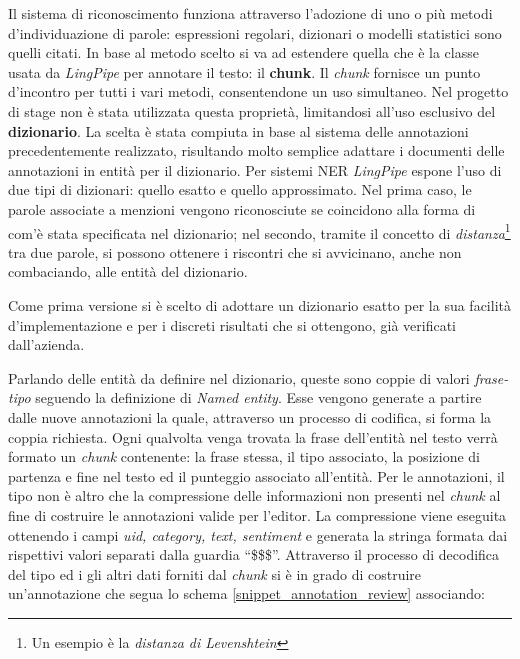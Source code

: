 Il sistema di riconoscimento funziona attraverso l'adozione di uno o più metodi
d'individuazione di parole: espressioni regolari, dizionari o modelli
statistici sono quelli citati. In base al metodo scelto si va ad estendere
quella che è la classe usata da \textit{LingPipe} per annotare il testo: il
\textbf{chunk}. Il \textit{chunk} fornisce un punto d'incontro per tutti i vari
metodi, consentendone un uso simultaneo. Nel progetto di stage non è
stata utilizzata questa proprietà, limitandosi all'uso esclusivo del
\textbf{dizionario}. La scelta è stata compiuta in base al sistema delle
annotazioni precedentemente realizzato, risultando molto semplice adattare i
documenti delle annotazioni in entità per il dizionario. Per sistemi \gls{NER}
\textit{LingPipe} espone l'uso di due tipi di dizionari: quello esatto e quello
approssimato. Nel prima caso, le parole associate a menzioni vengono
riconosciute se coincidono alla forma di com'è stata specificata nel dizionario;
nel secondo, tramite il concetto di \textit{distanza}\footnote{Un esempio è la
\textit{distanza di Levenshtein}} tra due parole, si possono ottenere i
riscontri che si avvicinano, anche non combaciando, alle entità del dizionario.

Come prima versione si è scelto di adottare un dizionario esatto per la sua
facilità d'implementazione e per i discreti risultati che si ottengono, già
verificati dall'azienda.

Parlando delle entità da definire nel dizionario, queste sono coppie di valori
\textit{frase-tipo} seguendo la definizione di \textit{Named entity}. Esse
vengono generate a partire dalle nuove annotazioni la quale, attraverso un
processo di codifica, si forma la coppia richiesta. Ogni qualvolta venga trovata
la frase dell'entità nel testo verrà formato un \textit{chunk} contenente:
la frase stessa, il tipo associato, la posizione di partenza e fine nel testo ed
il punteggio associato all'entità. Per le annotazioni, il tipo non è altro che
la compressione delle informazioni non presenti nel \textit{chunk} al fine di
costruire le annotazioni valide per l'editor. La compressione viene eseguita
ottenendo i campi \textit{uid, category, text, sentiment} e generata la stringa
formata dai rispettivi valori separati dalla guardia ``\$\$\$''. Attraverso il
processo di decodifica del tipo ed i gli altri dati forniti dal \textit{chunk}
si è in grado di costruire un'annotazione che segua lo schema
\ref{snippet_annotation_review} associando:

